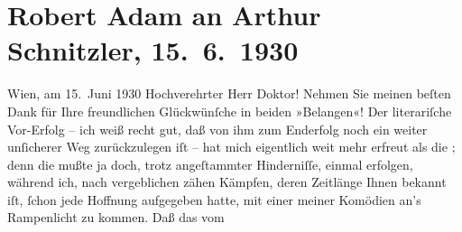 

               \section[Robert Adam an Arthur Schnitzler, 15. 6. 1930]{ Robert Adam an Arthur Schnitzler, 15. 6. 1930}\nopagebreak{}\rehead{ }\begin{ledgroupsized}[t]{13cm}\normalsize\beginnumbering{} \toendnotes[C]{\smallbreak\pagebreak[2]} 
\toendnotes[C]{\smallbreak}\pstart
           \raggedleft{}{\pb}Wien, am 15. Juni 1930\pend
           \pstart{}Hochverehrter Herr Doktor!\pend\pstart
           Nehmen Sie meinen beſten Dank für Ihre freundlichen Glückwünſche in beiden
                    »Belangen«!\pend
           \pstart
           Der literariſche Vor-Erfolg – ich weiß recht gut, daß von ihm zum Enderfolg noch
                    ein weiter unſicherer Weg zurückzulegen iſt – hat mich eigentlich weit mehr
                    erfreut als die \label{K_L02538_1v}\label{K_L02538_1h}; denn die mußte ja doch, trotz
                    angeſtammter Hinderniſſe, einmal erfolgen, während ich, nach vergeblichen zähen
                    Kämpfen, deren Zeitlänge Ihnen bekannt iſt, ſchon jede Hoffnung aufgegeben
                    hatte, mit einer meiner Komödien an’s Rampenlicht zu kommen. Daß das vom

\end{ledgroupsized}
